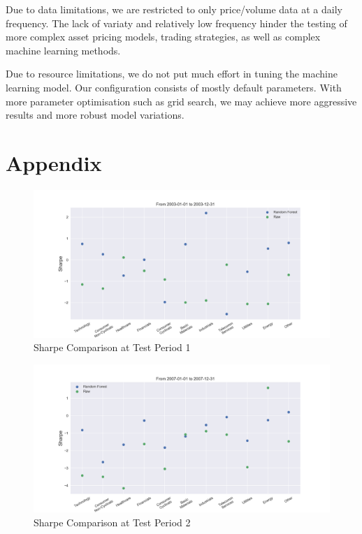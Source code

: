 \documentclass[12pt]{article}
\begin{document}
Due to data limitations, we are restricted to only price/volume data at a daily frequency. The lack of variaty and relatively low frequency hinder the testing of more complex asset pricing models, trading strategies, as well as complex machine learning methods.

Due to resource limitations, we do not put much effort in tuning the machine learning model. Our configuration consists of mostly default parameters. With more parameter optimisation such as grid search, we may achieve more aggressive results and more robust model variations.

\section{Appendix}

\begin{figure}[!ht]
  \begin{center}
    \includegraphics[width=1\linewidth]{figure/rf_raw_Sharpe_time_0.png}
  \end{center}
  \caption{Sharpe Comparison at Test Period 1}
  \label{fig:rf_raw_Sharpe_time_1}
\end{figure}

\begin{figure}[!ht]
  \begin{center}
    \includegraphics[width=1\linewidth]{figure/rf_raw_Sharpe_time_1.png}
  \end{center}
  \caption{Sharpe Comparison at Test Period 2}
  \label{fig:rf_raw_Sharpe_time_2}
\end{figure}
\end{document}
